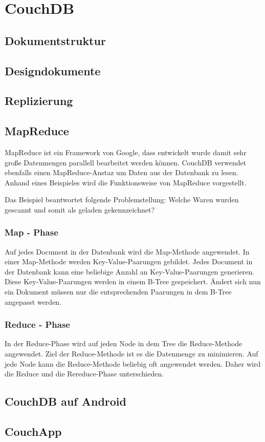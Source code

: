 \section{CouchDB}

\subsection{Dokumentstruktur}

\subsection{Designdokumente}

\subsection{Replizierung}

\subsection{MapReduce}

MapReduce ist ein Framework von Google, dass entwickelt wurde damit sehr große Datenmengen parallell bearbeitet werden können. CouchDB verwendet ebenfalls einen MapReduce-Anstaz um Daten aus der Datenbank zu lesen. Anhand eines Beispieles wird die Funktionsweise von MapReduce vorgestellt.

Das Beispiel beantwortet folgende Problemstellung: Welche Waren wurden gescannt und somit als geladen gekennzeichnet?

\subsubsection{Map - Phase}

Auf jedes Document in der Datenbank wird die Map-Methode angewendet. In einer Map-Methode werden Key-Value-Paarungen gebildet. Jedes Document in der Datenbank kann eine beliebige Anzahl an Key-Value-Paarungen generieren. Diese Key-Value-Paarungen werden in einem B-Tree gespeichert. Ändert sich nun ein Dokument müssen nur die entsprechenden Paarungen in dem B-Tree angepasst werden. 

\subsubsection{Reduce - Phase}

In der Reduce-Phase wird auf jeden Node in dem Tree die Reduce-Methode angewendet. Ziel der Reduce-Methode ist es die Datenmenge zu minimieren. Auf jede Node kann die Reduce-Methode beliebig oft angewendet werden. Daher wird die Reduce und die Rereduce-Phase unterschieden.

\subsection{CouchDB auf Android}

\subsection{CouchApp}

